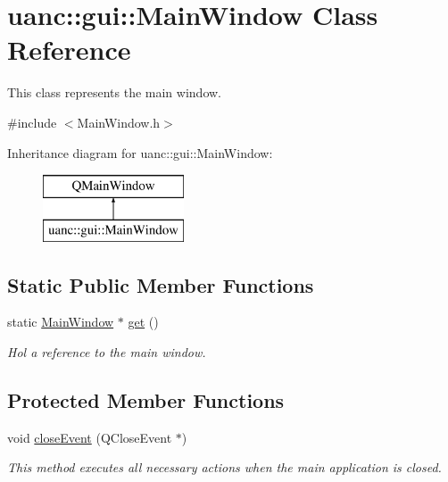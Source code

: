 \hypertarget{classuanc_1_1gui_1_1_main_window}{}\section{uanc\+:\+:gui\+:\+:Main\+Window Class Reference}
\label{classuanc_1_1gui_1_1_main_window}


This class represents the main window.  




{\ttfamily \#include $<$Main\+Window.\+h$>$}

Inheritance diagram for uanc\+:\+:gui\+:\+:Main\+Window\+:\begin{figure}[H]
\begin{center}
\leavevmode
\includegraphics[height=2.000000cm]{classuanc_1_1gui_1_1_main_window}
\end{center}
\end{figure}
\subsection*{Static Public Member Functions}
\begin{DoxyCompactItemize}
\item 
static \hyperlink{classuanc_1_1gui_1_1_main_window}{Main\+Window} $\ast$ \hyperlink{classuanc_1_1gui_1_1_main_window_ae3833ff9b8d0e1feb996ce009887f239}{get} ()
\begin{DoxyCompactList}\small\item\em Hol a reference to the main window. \end{DoxyCompactList}\end{DoxyCompactItemize}
\subsection*{Protected Member Functions}
\begin{DoxyCompactItemize}
\item 
void \hyperlink{classuanc_1_1gui_1_1_main_window_a523b741dd8f49b3dfaf8a66bd76a254b}{close\+Event} (Q\+Close\+Event $\ast$)
\begin{DoxyCompactList}\small\item\em This method executes all necessary actions when the main application is closed. \end{DoxyCompactList}\end{DoxyCompactItemize}


